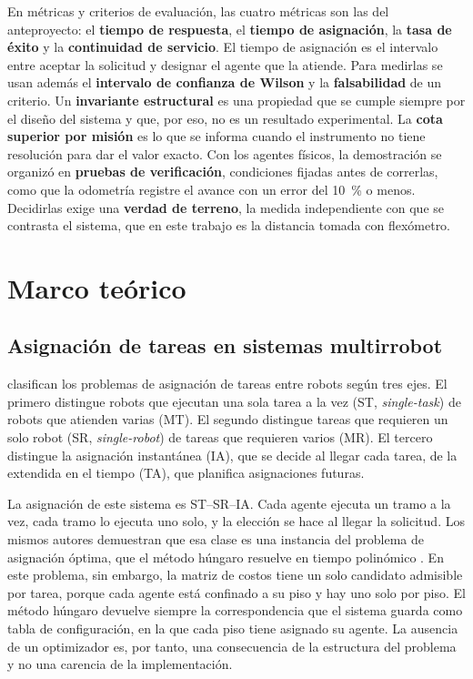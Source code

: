 En métricas y criterios de evaluación, las cuatro métricas son las del
anteproyecto: el \textbf{tiempo de respuesta}, el \textbf{tiempo de asignación}, la \textbf{tasa de éxito} y la
\textbf{continuidad de servicio}. El tiempo de asignación es el intervalo entre
aceptar la solicitud y designar el agente que la atiende. Para medirlas se usan
además el \textbf{intervalo de confianza de Wilson} y la \textbf{falsabilidad}
de un criterio. Un \textbf{invariante estructural} es una
propiedad que se cumple siempre por el diseño del sistema y que, por eso, no es
un resultado experimental. La \textbf{cota superior por misión} es lo que se
informa cuando el instrumento no tiene resolución para dar el valor exacto. Con los agentes físicos, la demostración se organizó en \textbf{pruebas de
verificación}, condiciones fijadas antes de correrlas, como
que la odometría registre el avance con un error del 10~\% o menos. Decidirlas
exige una \textbf{verdad de terreno}, la medida independiente con que se
contrasta el sistema, que en este trabajo es la distancia tomada con flexómetro.

\section{Marco teórico}
\label{sec:teorico}

\subsection{Asignación de tareas en sistemas multirrobot}
\label{sec:teo-asignacion}

\textcite{gerkey2004taxonomy} clasifican los problemas de asignación de tareas
entre robots según tres ejes. El primero distingue robots que ejecutan una sola
tarea a la vez (ST, \textit{single-task}) de robots que atienden varias (MT). El
segundo distingue tareas que requieren un solo robot (SR, \textit{single-robot})
de tareas que requieren varios (MR). El tercero distingue la asignación
instantánea (IA), que se decide al llegar cada tarea, de la extendida en el
tiempo (TA), que planifica asignaciones futuras.

La asignación de este sistema es ST--SR--IA. Cada agente ejecuta un tramo a la vez, cada tramo lo ejecuta uno solo, y la elección se hace al llegar la solicitud. Los mismos autores demuestran que esa clase es una instancia del
problema de asignación óptima, que el método húngaro resuelve en tiempo
polinómico \autocite{kuhn1955hungarian}. En este problema, sin embargo, la matriz
de costos tiene un solo candidato admisible por tarea, porque cada agente está
confinado a su piso y hay uno solo por piso. El método húngaro devuelve siempre
la correspondencia que el sistema guarda como tabla de configuración, en la que
cada piso tiene asignado su agente. La ausencia de un optimizador es, por
tanto, una consecuencia de la estructura del problema y no una carencia de la
implementación.


